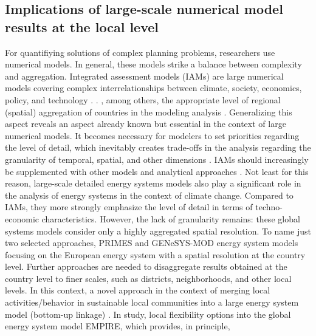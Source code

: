 \subsection{Implications of large-scale numerical model results at the local level}
For quantifiying solutions of complex planning problems, researchers use numerical models. In general, these models strike a balance between complexity and aggregation. Integrated assessment models (IAMs) are large numerical models covering complex interrelationships between climate, society, economics, policy, and technology \cite{dowlatabadi1995integrated}. . , among others, the appropriate level of regional (spatial) aggregation of countries in the modeling analysis . Generalizing this aspect reveals an aspect already known but essential in the context of large numerical models. It becomes necessary for modelers to set priorities regarding the level of detail, which inevitably creates trade-offs in the analysis regarding the granularity of temporal, spatial, and other dimensions \cite{gargiulo2013long}. IAMs should  increasingly be supplemented with other models and analytical approaches . Not least for this reason, large-scale detailed energy systems models also play a significant role in the analysis of energy systems in the context of climate change. Compared to IAMs, they more strongly emphasize the level of detail in terms of techno-economic characteristics. However, the lack of granularity remains: these global systems models consider only a highly aggregated spatial resolution. To name just two selected approaches, PRIMES\deleted{)}  and GENeSYS-MOD\deleted{)}   energy system models focusing on the European energy system with a spatial resolution at the country level. Further approaches are needed to disaggregate results obtained at the country level to finer scales, such as districts, neighborhoods, and other local levels. In this context, a novel approach in the context of merging local activities/behavior in sustainable local communities into a large energy system model (bottom-up linkage) . In  study, local flexibility options  into the global energy system model EMPIRE, which provides, in principle, 
